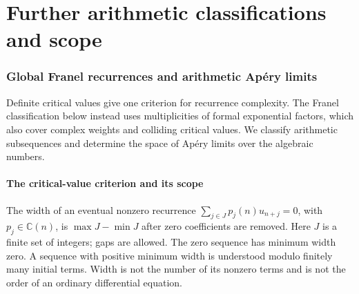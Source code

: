 \documentclass[11pt,a4paper]{article}
\theoremstyle{definition}
\theoremstyle{remark}
\numberwithin{equation}{section}
\begin{document}
\clearpage\part{Further arithmetic classifications and scope}

\section{Global Franel recurrences and arithmetic Ap\'ery limits}
\label{E:ac:section}

Definite critical values give one criterion for recurrence complexity.
The Franel classification below instead uses multiplicities of formal
exponential factors, which also cover complex weights and colliding
critical values. We classify arithmetic subsequences and determine
the space of Ap\'ery limits over the algebraic numbers.

\subsection{The critical-value criterion and its scope}

The width of an eventual nonzero recurrence
$\sum_{j\in J}p_j(n)u_{n+j}=0$, with $p_j\in\mathbb C(n)$, is
$\max J-\min J$ after zero coefficients are removed. Here $J$ is a
finite set of integers; gaps are allowed. The zero sequence has minimum
width zero. A sequence with positive minimum width is understood modulo
finitely many initial terms. Width is not the number of its nonzero
terms and is not the order of an ordinary differential equation.
\end{document}
